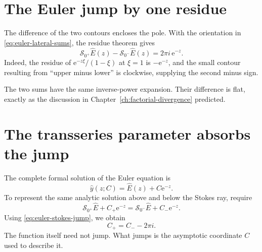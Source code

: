 \documentclass[11pt,oneside]{book}
\theoremstyle{definition}
\theoremstyle{remark}
\newcommand{\e}{\mathrm{e}}
\begin{document}
\begin{center}
\end{center}

\section{The Euler jump by one residue}

The difference of the two contours encloses the pole. With the orientation in
\eqref{eq:euler-lateral-sums}, the residue theorem gives
\begin{equation}
  \mathcal S_{0^+}\widehat E(z)
  -\mathcal S_{0^-}\widehat E(z)
  =2\pi i\,\e^{-z}.
  \label{eq:euler-stokes-jump}
\end{equation}
Indeed, the residue of $\e^{-z\xi}/(1-\xi)$ at $\xi=1$ is $-\e^{-z}$, and the
small contour resulting from ``upper minus lower'' is clockwise, supplying the
second minus sign.

The two sums have the same inverse-power expansion. Their difference is flat,
exactly as the discussion in Chapter~\ref{ch:factorial-divergence} predicted.

\section{The transseries parameter absorbs the jump}

The complete formal solution of the Euler equation is
\begin{equation}
  \widehat y(z;C)=\widehat E(z)+C\e^{-z}.
  \label{eq:euler-full-transseries-stokes}
\end{equation}
To represent the same analytic solution above and below the Stokes ray, require
\[
  \mathcal S_{0^+}\widehat E+C_+\e^{-z}
  =\mathcal S_{0^-}\widehat E+C_-\e^{-z}.
\]
Using \eqref{eq:euler-stokes-jump}, we obtain
\begin{equation}
  C_+=C_--2\pi i.
  \label{eq:euler-parameter-jump}
\end{equation}
The function itself need not jump. What jumps is the asymptotic coordinate $C$
used to describe it.
\end{document}
